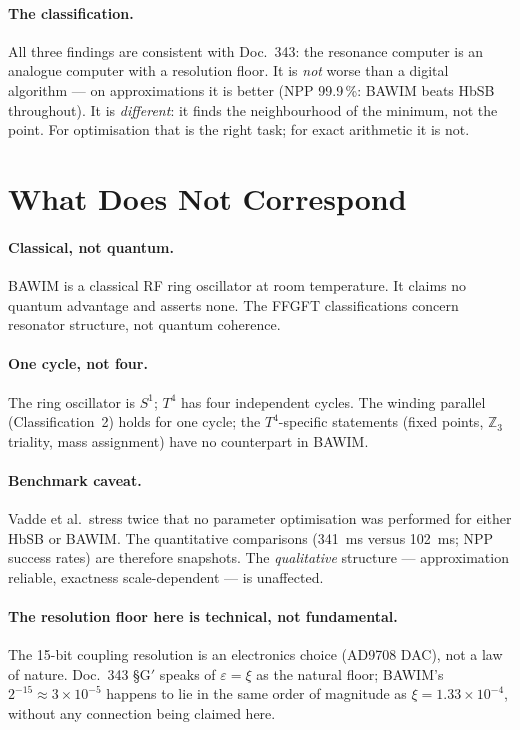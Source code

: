 \paragraph{The classification.} All three findings are consistent with
Doc.~343: the resonance computer is an analogue computer with a resolution
floor. It is \emph{not} worse than a digital algorithm --- on
approximations it is better (NPP 99.9\,\%: BAWIM beats HbSB throughout).
It is \emph{different}: it finds the neighbourhood of the minimum, not the
point. For optimisation that is the right task; for exact arithmetic it is
not. \SM

\section{What Does Not Correspond}

\paragraph{Classical, not quantum.} BAWIM is a classical RF ring
oscillator at room temperature. It claims no quantum advantage and asserts
none. The FFGFT classifications concern resonator structure, not quantum
coherence.

\paragraph{One cycle, not four.} The ring oscillator is $S^1$; $T^4$ has
four independent cycles. The winding parallel (Classification~2) holds for
one cycle; the $T^4$-specific statements (fixed points, $\mathbb{Z}_3$
triality, mass assignment) have no counterpart in BAWIM.

\paragraph{Benchmark caveat.} Vadde et al.\ stress twice that no parameter
optimisation was performed for either HbSB or BAWIM. The quantitative
comparisons (341~ms versus 102~ms; NPP success rates) are therefore
snapshots. The \emph{qualitative} structure --- approximation reliable,
exactness scale-dependent --- is unaffected.

\paragraph{The resolution floor here is technical, not fundamental.} The
15-bit coupling resolution is an electronics choice (AD9708 DAC), not a law
of nature. Doc.~343 §G$'$ speaks of $\varepsilon=\xi$ as the natural floor;
BAWIM's $2^{-15}\approx3\times10^{-5}$ happens to lie in the same order of
magnitude as $\xi=1.33\times10^{-4}$, without any connection being claimed
here.

